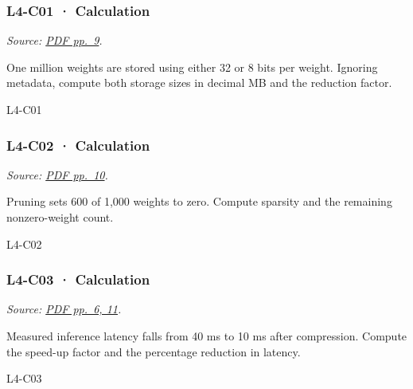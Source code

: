 \noindent\begin{minipage}{\linewidth}

\subsubsection{L4-C01 · Calculation}\label{l4-c01-calculation}

\emph{Source:
\href{../Lab\%20Sessions/Lab4/manolo_presentation.pdf\#page=9}{PDF
pp.~9}.}

One million weights are stored using either 32 or 8 bits per weight.
Ignoring metadata, compute both storage sizes in decimal MB and the
reduction factor.

\begin{solution}[26mm]{L4-C01}

\end{solution}
\end{minipage}\par\medskip

\noindent\begin{minipage}{\linewidth}

\subsubsection{L4-C02 · Calculation}\label{l4-c02-calculation}

\emph{Source:
\href{../Lab\%20Sessions/Lab4/manolo_presentation.pdf\#page=10}{PDF
pp.~10}.}

Pruning sets 600 of 1,000 weights to zero. Compute sparsity and the
remaining nonzero-weight count.

\begin{solution}[26mm]{L4-C02}

\end{solution}
\end{minipage}\par\medskip

\noindent\begin{minipage}{\linewidth}

\subsubsection{L4-C03 · Calculation}\label{l4-c03-calculation}

\emph{Source:
\href{../Lab\%20Sessions/Lab4/manolo_presentation.pdf\#page=6}{PDF
pp.~6, 11}.}

Measured inference latency falls from 40 ms to 10 ms after compression.
Compute the speed-up factor and the percentage reduction in latency.

\begin{solution}[26mm]{L4-C03}

\end{solution}
\end{minipage}\par\medskip



